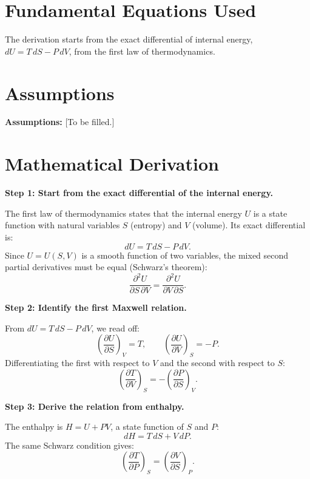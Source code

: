 \section*{Fundamental Equations Used}

The derivation starts from the exact differential of internal energy, $dU = T\,dS - P\,dV$, from the first law of thermodynamics.

\section*{Assumptions}

\textbf{Assumptions:} [To be filled.]

\section*{Mathematical Derivation}

\textbf{Step 1: Start from the exact differential of the internal energy.}

The first law of thermodynamics states that the internal energy $U$ is a state function with natural variables $S$ (entropy) and $V$ (volume). Its exact differential is:
\begin{equation}
dU = T\,dS - P\,dV.
\end{equation}
Since $U = U(S,V)$ is a smooth function of two variables, the mixed second partial derivatives must be equal (Schwarz's theorem):
\begin{equation}
\frac{\partial^{2}U}{\partial S\,\partial V} = \frac{\partial^{2}U}{\partial V\,\partial S}.
\end{equation}

\textbf{Step 2: Identify the first Maxwell relation.}

From $dU = T\,dS - P\,dV$, we read off:
\begin{equation}
\left(\frac{\partial U}{\partial S}\right)_{V} = T, \qquad \left(\frac{\partial U}{\partial V}\right)_{S} = -P.
\end{equation}
Differentiating the first with respect to $V$ and the second with respect to $S$:
\begin{equation}
\left(\frac{\partial T}{\partial V}\right)_{S} = -\left(\frac{\partial P}{\partial S}\right)_{V}.
\end{equation}

\textbf{Step 3: Derive the relation from enthalpy.}

The enthalpy is $H = U + PV$, a state function of $S$ and $P$:
\begin{equation}
dH = T\,dS + V\,dP.
\end{equation}
The same Schwarz condition gives:
\begin{equation}
\left(\frac{\partial T}{\partial P}\right)_{S} = \left(\frac{\partial V}{\partial S}\right)_{P}.
\end{equation}

